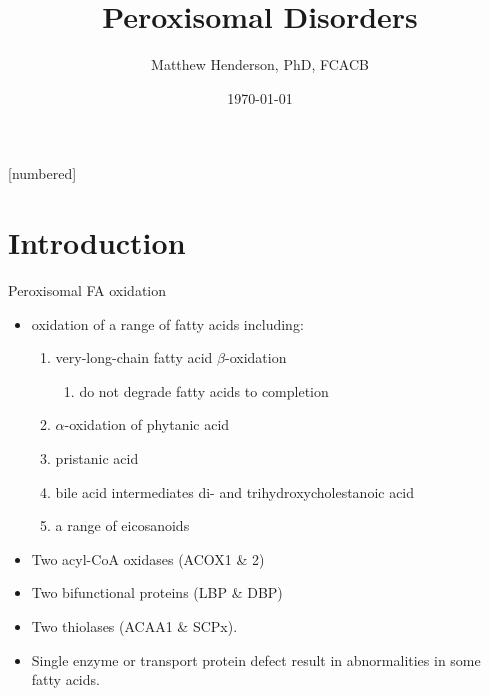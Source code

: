 \documentclass[presentation, smaller]{beamer}
\author{Matthew Henderson, PhD, FCACB}
\date{\today}
\title{Peroxisomal Disorders}
\institute[NSO]{Newborn Screening Ontario | The University of Ottawa}
\begin{document}
\maketitle


\vspace{220pt}
\beamertemplatenavigationsymbolsempty
{}[numbered]

\section{Introduction}
\label{sec:org04c6dce}
\begin{frame}[label={sec:org5511052}]{Peroxisomal FA oxidation}
\begin{itemize}
\item oxidation of a range of fatty acids including:
\begin{enumerate}
\item very-long-chain fatty acid \(\beta\)-oxidation
\begin{enumerate}
\item do not degrade fatty acids to completion
\end{enumerate}
\item \(\alpha\)-oxidation of phytanic acid
\item pristanic acid
\item bile acid intermediates di- and trihydroxycholestanoic acid
\item a range of eicosanoids
\end{enumerate}

\item Two acyl-CoA oxidases (ACOX1 \& 2)
\item Two bifunctional proteins (LBP \& DBP)
\item Two thiolases (ACAA1 \& SCPx).
\item Single enzyme or transport protein defect result in abnormalities in some fatty acids.
\end{itemize}
\end{frame}
\end{document}
